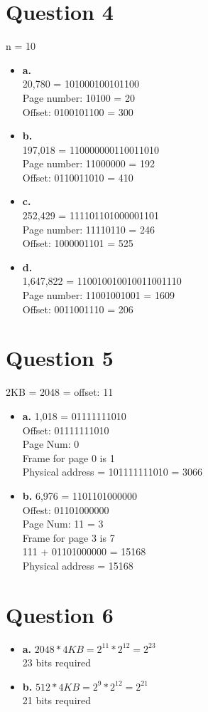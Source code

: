 \documentclass[11pt]{article}
\begin{document}
\section*{Question 4}
n = 10
\begin{itemize}
    \item \textbf{a.}\\
        20,780 = 101000100101100\\
        Page number: 10100 = 20\\
        Offset: 0100101100 = 300
    \item \textbf{b.}\\
        197,018 = 110000000110011010\\
        Page number: 11000000 = 192\\
        Offset: 0110011010 = 410
    \item \textbf{c.}\\
        252,429 = 111101101000001101\\
        Page number: 11110110 = 246\\
        Offset: 1000001101 = 525
    \item \textbf{d.}\\
        1,647,822 = 110010010010011001110\\
        Page number: 11001001001 = 1609\\
        Offset: 0011001110 = 206
\end{itemize}
\section*{Question 5}
2KB = 2048 = offset: 11
\begin{itemize}
    \item \textbf{a.}
        1,018 = 01111111010\\
        Offset: 01111111010\\
        Page Num: 0\\
        Frame for page 0 is 1\\
        Physical address = 101111111010 = 3066
    \item \textbf{b.}
        6,976 = 1101101000000\\
        Offest: 01101000000\\
        Page Num: 11 = 3\\
        Frame  for page 3 is 7\\
        111 + 01101000000 = 15168\\
        Physical address = 15168
\end{itemize}
\section*{Question 6}
\begin{itemize}
    \item \textbf{a.}
        $2048 * 4KB = 2^{11} * 2^{12} = 2^{23}$\\
        23 bits required
    \item \textbf{b.}
        $512 * 4KB = 2^{9} * 2^{12} = 2^{21}$\\
        21 bits required
    
\end{itemize}
\end{document}
